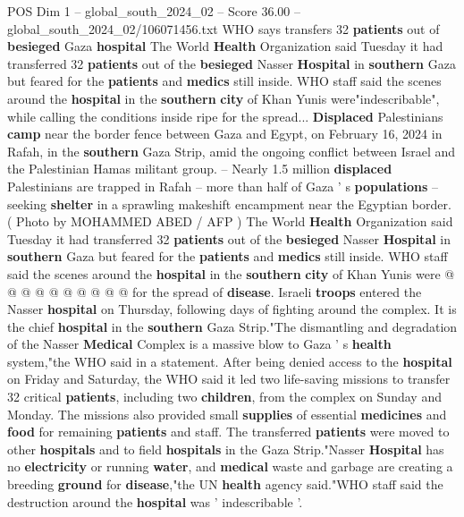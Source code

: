 \begin{textsample}{POS Dim 1 – global\_south\_2024\_02 – Score 36.00 – global\_south\_2024\_02/106071456.txt}  \label{ex:f1_pos_021}
WHO says transfers 32 \textbf{patients} out of \textbf{besieged} Gaza \textbf{hospital} The World \textbf{Health} Organization said Tuesday it had transferred 32 \textbf{patients} out of the \textbf{besieged} Nasser \textbf{Hospital} in \textbf{southern} Gaza but feared for the \textbf{patients} and \textbf{medics} still inside.
WHO staff said the scenes around the \textbf{hospital} in the \textbf{southern} \textbf{city} of Khan Yunis were"indescribable", while calling the conditions inside ripe for the spread... \textbf{Displaced} Palestinians \textbf{camp} near the border fence between Gaza and Egypt, on February 16, 2024 in Rafah, in the \textbf{southern} Gaza Strip, amid the ongoing conflict between Israel and the Palestinian Hamas militant group. -- Nearly 1.5 million \textbf{displaced} Palestinians are trapped in Rafah -- more than half of Gaza ' s \textbf{populations} -- seeking \textbf{shelter} in a sprawling makeshift encampment near the Egyptian border. ( Photo by MOHAMMED ABED / AFP ) The World \textbf{Health} Organization said Tuesday it had transferred 32 \textbf{patients} out of the \textbf{besieged} Nasser \textbf{Hospital} in \textbf{southern} Gaza but feared for the \textbf{patients} and \textbf{medics} still inside.
WHO staff said the scenes around the \textbf{hospital} in the \textbf{southern} \textbf{city} of Khan Yunis were @ @ @ @ @ @ @ @ @ @ for the spread of \textbf{disease}.
Israeli \textbf{troops} entered the Nasser \textbf{hospital} on Thursday, following days of fighting around the complex.
It is the chief \textbf{hospital} in the \textbf{southern} Gaza Strip."The dismantling and degradation of the Nasser \textbf{Medical} Complex is a massive blow to Gaza ' s \textbf{health} system,"the WHO said in a statement.
After being denied access to the \textbf{hospital} on Friday and Saturday, the WHO said it led two life-saving missions to transfer 32 critical \textbf{patients}, including two \textbf{children}, from the complex on Sunday and Monday.
The missions also provided small \textbf{supplies} of essential \textbf{medicines} and \textbf{food} for remaining \textbf{patients} and staff.
The transferred \textbf{patients} were moved to other \textbf{hospitals} and to field \textbf{hospitals} in the Gaza Strip."Nasser \textbf{Hospital} has no \textbf{electricity} or running \textbf{water}, and \textbf{medical} waste and garbage are creating a breeding \textbf{ground} for \textbf{disease},"the UN \textbf{health} agency said."WHO staff said the destruction around the \textbf{hospital} was ' indescribable '.

\end{textsample}
